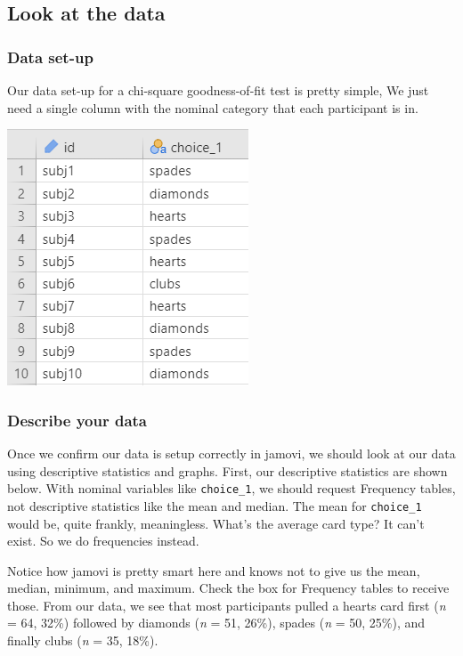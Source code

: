 \documentclass[
]{book}
\begin{document}
\hypertarget{look-at-the-data-3}{%
\subsection{Look at the data}\label{look-at-the-data-3}}

\hypertarget{data-set-up-3}{%
\subsubsection{Data set-up}\label{data-set-up-3}}

Our data set-up for a chi-square goodness-of-fit test is pretty simple, We just need a single column with the nominal category that each participant is in.

\includegraphics{images/09-chi-square/chi-square_data.png}

\hypertarget{describe-your-data}{%
\subsubsection{Describe your data}\label{describe-your-data}}

Once we confirm our data is setup correctly in jamovi, we should look at our data using descriptive statistics and graphs. First, our descriptive statistics are shown below. With nominal variables like \texttt{choice\_1}, we should request Frequency tables, not descriptive statistics like the mean and median. The mean for \texttt{choice\_1} would be, quite frankly, meaningless. What's the average card type? It can't exist. So we do frequencies instead.

Notice how jamovi is pretty smart here and knows not to give us the mean, median, minimum, and maximum. Check the box for Frequency tables to receive those. From our data, we see that most participants pulled a hearts card first (\emph{n} = 64, 32\%) followed by diamonds (\emph{n} = 51, 26\%), spades (\emph{n} = 50, 25\%), and finally clubs (\emph{n} = 35, 18\%).
\end{document}
